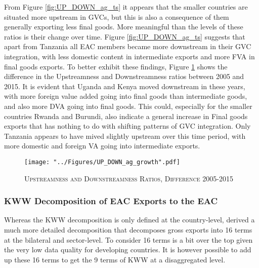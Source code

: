 \documentclass[a4paper]{article}
\begin{document}
From Figure \ref{fig:UP_DOWN_ag_ts} it appears that the smaller countries are situated more upstream in GVCs, but this is also a consequence of them generally exporting less final goods. More meaningful than the levels of these ratios is their change over time. Figure \ref{fig:UP_DOWN_ag_ts} suggests that apart from Tanzania all EAC members became more downstream in their GVC integration, with less domestic content in intermediate exports and more FVA in final goods exports. To better exhibit these findings, Figure \ref{fig:UP_DOWN_ag_growth} shows the difference in the Upstreamness and Downstreamness ratios between 2005 and 2015. It is evident that Uganda and Kenya moved downstream in these years, with more foreign value added going into final goods than intermediate goods, and also more DVA going into final goods. This could, especially for the smaller countries Rwanda and Burundi, also indicate a general increase in Final goods exports that has nothing to do with shifting patterns of GVC integration. %
Only Tanzania appears to have mived slightly upstream over this time period, with more domestic and foreign VA going into intermediate exports. 

\begin{figure}[h!]
\centering
\caption{\label{fig:UP_DOWN_ag_growth}\textsc{Upstreamness and Downstreamness Ratios, Difference 2005-2015}}
\texttt{[image: "../Figures/UP\_DOWN\_ag\_growth".pdf]} %
\end{figure}
\FloatBarrier


\subsubsection{KWW Decomposition of EAC Exports to the EAC}

Whereas the KWW decomposition is only defined at the country-level, \citet{wang2013quantifying} derived a much more detailed decomposition that decomposes gross exports into 16 terms at the bilateral and sector-level. To consider 16 terms is a bit over the top given the very low data quality for developing countries. It is however possible to add up these 16 terms to get the 9 terms of KWW at a disaggregated level. \newline 
\end{document}
